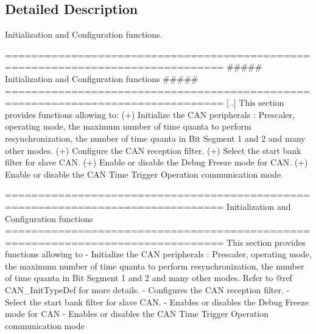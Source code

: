 \subsection{Detailed Description}
Initialization and Configuration functions. \begin{DoxyVerb} ===============================================================================
              ##### Initialization and Configuration functions #####
 ===============================================================================  
    [..] This section provides functions allowing to: 
         (+) Initialize the CAN peripherals : Prescaler, operating mode, the maximum 
             number of time quanta to perform resynchronization, the number of time 
             quanta in Bit Segment 1 and 2 and many other modes. 
         (+) Configure the CAN reception filter.                                      
         (+) Select the start bank filter for slave CAN.
         (+) Enable or disable the Debug Freeze mode for CAN.
         (+) Enable or disable the CAN Time Trigger Operation communication mode.\end{DoxyVerb}


\begin{DoxyVerb} ===============================================================================
                      Initialization and Configuration functions
 ===============================================================================  
  This section provides functions allowing to 
   - Initialize the CAN peripherals : Prescaler, operating mode, the maximum number 
     of time quanta to perform resynchronization, the number of time quanta in
     Bit Segment 1 and 2 and many other modes. 
     Refer to  @ref CAN_InitTypeDef  for more details.
   - Configures the CAN reception filter.                                      
   - Select the start bank filter for slave CAN.
   - Enables or disables the Debug Freeze mode for CAN
   - Enables or disables the CAN Time Trigger Operation communication mode\end{DoxyVerb}
 

